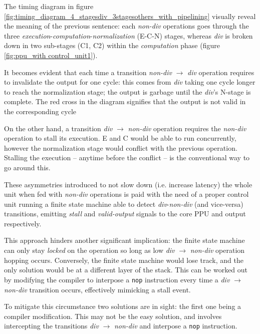 The timing diagram in figure \ref{fig:timing_diagram_4_stagesdiv_3stagesothers_with_pipelining}  visually reveal the meaning of the previous sentence: each \textit{non-div} operations goes through the three \textit{execution}-\textit{computation}-\textit{normalization} (E-C-N) stages, whereas \textit{div} is broken down in two sub-stages (C1, C2) within the \textit{computation} phase (figure \ref{fig:ppu_with control_unit1}).

It becomes evident that each time a transition \textit{non-div} $\rightarrow$ \textit{div} operation requires to invalidate the output for one cycle: this comes from \textit{div} taking one cycle longer to reach the normalization stage; the output is garbage until the \textit{div}'s N-stage is complete. The red cross in the diagram signifies that the output is not valid in the corresponding cycle

On the other hand, a transition \textit{div} $\rightarrow$ \textit{non-div} operation requires the \textit{non-div} operation to stall its execution. E and C would be able to run concurrently, however the normalization stage would conflict with the previous operation. Stalling the execution -- anytime before the conflict -- is the conventional way to go around this.

These asymmetries introduced to not slow down (i.e. increase latency) the whole unit when fed with \textit{non-div} operations is paid with the need of a proper control unit running a finite state machine able to detect \textit{div}-\textit{non-div} (and vice-versa) transitions, emitting \textit{stall} and \textit{valid-output} signals to the core PPU and output respectively.


This approach hinders another significant implication: the finite state machine can only stay \textit{locked} on the operation so long as low \textit{div} $\rightarrow$ \textit{non-div} operation hopping occurs. Conversely, the finite state machine would lose track, and the only solution would be at a different layer of the stack.
This can be worked out by modifying the compiler to interpose a \texttt{nop} instruction every time a \textit{div} $\rightarrow$ \textit{non-div} transition occurs, effectively mimicking a stall event.



To mitigate this circumstance two solutions are in sight: the first one being a compiler modification. This may not be the easy solution, and involves intercepting the transitions \textit{div} $\rightarrow$ \textit{non-div} and interpose a \texttt{nop} instruction.

